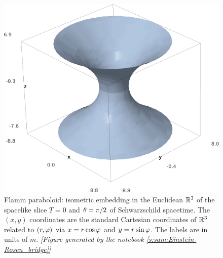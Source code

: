 \begin{figure}
\centerline{\includegraphics[height=0.4\textheight]{max_flamm_paraboloid.png}}
\caption[]{\label{f:max:flamm_paraboloid} \footnotesize
Flamm paraboloid: isometric embedding in the Euclidean $\mathbb{R}^3$
of the spacelike slice $T=0$ and $\theta=\pi/2$ of Schwarzschild spacetime.
The $(x,y)$ coordinates are the standard Cartesian coordinates of $\mathbb{R}^3$ related
to $(r,\varphi)$ via $x=r\cos\varphi$ and $y=r\sin\varphi$. The labels are in units of $m$.
\textsl{[Figure generated by the notebook \ref{s:sam:Einstein-Rosen_bridge}]}
}
\end{figure}

